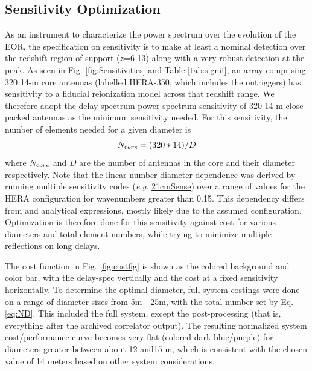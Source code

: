 \documentclass[preprint,11pt]{aastex}
\begin{document}
\subsection{Sensitivity Optimization}
\label{sec:cost}
As an instrument to characterize the power spectrum over the evolution of the EOR, the specification on sensitivity is to make at least a nominal detection over the redshift region of support ($z$=6-13) along with a very robust detection at the peak.  As seen in Fig. \ref{fig:Sensitivities} and Table \ref{tab:signif}, an array comprising 320 14-m core antennas (labelled HERA-350, which includes the outriggers) has sensitivity to a
fiducial reionization model across that redshift range.  We therefore adopt the delay-spectrum power spectrum sensitivity of 320 14-m close-packed antennas as the minimum sensitivity needed.  
For this sensitivity, the number of elements needed for a given diameter is
\begin{equation}
\label{eq:ND}
N_{\text core} = (320*14)/D
\end{equation}
where $N_{\text core}$ and $D$ are the number of antennas in the core and their diameter respectively.  Note that the linear number-diameter dependence was derived by running multiple sensitivity codes ({\em e.g.} \url{21cmSense}) over a range of values for the HERA configuration for wavenumbers greater than 0.15.  This dependency differs from \cite{2013ExA....36..235M} and analytical expressions, mostly likely due to the assumed configuration.
Optimization is 
therefore done for this sensitivity against cost for various diameters and total element numbers, while trying to minimize multiple reflections on long delays.   

The cost function in Fig. \ref{fig:costfig} is shown as the colored background and color bar, with the delay-spec vertically and the cost at a fixed sensitivity horizontally. 
To determine the optimal diameter, full system costings were done on a range of diameter sizes from 5m - 25m, with the total number set by Eq. \ref{eq:ND}.  This included the full system, except the post-processing (that is, everything after the archived correlator output).  
The resulting normalized system cost/performance-curve  becomes very flat (colored dark blue/purple) for diameters greater between about 12 and15 m, which is consistent with the chosen value of 14 meters based on other system considerations.
\end{document}
